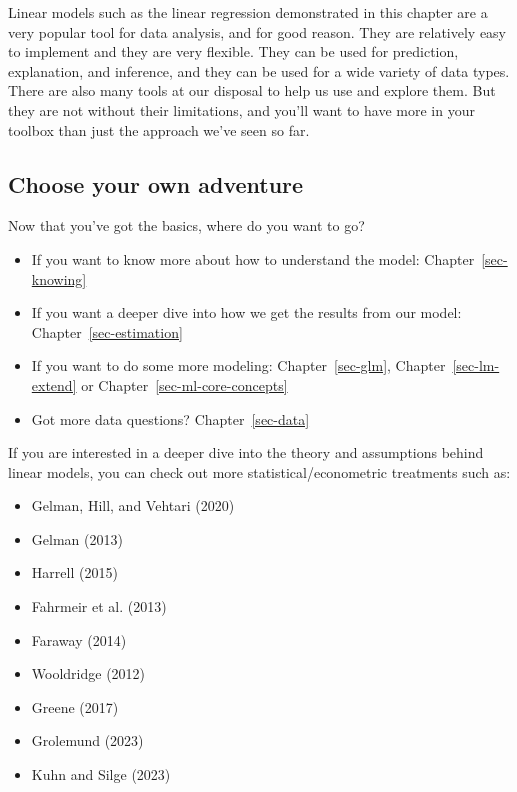 \documentclass[
  letterpaper,
]{krantz}
\providecommand{\tightlist}{%
  \setlength{\itemsep}{0pt}\setlength{\parskip}{0pt}}\usepackage{longtable,booktabs,array}
\begin{document}
Linear models such as the linear regression demonstrated in this chapter
are a very popular tool for data analysis, and for good reason. They are
relatively easy to implement and they are very flexible. They can be
used for prediction, explanation, and inference, and they can be used
for a wide variety of data types. There are also many tools at our
disposal to help us use and explore them. But they are not without their
limitations, and you'll want to have more in your toolbox than just the
approach we've seen so far.

\subsection{Choose your own adventure}\label{sec-lm-adventure}

Now that you've got the basics, where do you want to go?

\begin{itemize}
\tightlist
\item
  If you want to know more about how to understand the model:
  Chapter~\ref{sec-knowing}
\item
  If you want a deeper dive into how we get the results from our model:
  Chapter~\ref{sec-estimation}
\item
  If you want to do some more modeling: Chapter~\ref{sec-glm},
  Chapter~\ref{sec-lm-extend} or Chapter~\ref{sec-ml-core-concepts}
\item
  Got more data questions? Chapter~\ref{sec-data}
\end{itemize}

If you are interested in a deeper dive into the theory and assumptions
behind linear models, you can check out more statistical/econometric
treatments such as:

\begin{itemize}
\tightlist
\item
  Gelman, Hill, and Vehtari (2020)
\item
  Gelman (2013)
\item
  Harrell (2015)
\item
  Fahrmeir et al. (2013)
\item
  Faraway (2014)
\item
  Wooldridge (2012)
\item
  Greene (2017)
\item
  Grolemund (2023)
\item
  Kuhn and Silge (2023)
\end{itemize}
\end{document}
